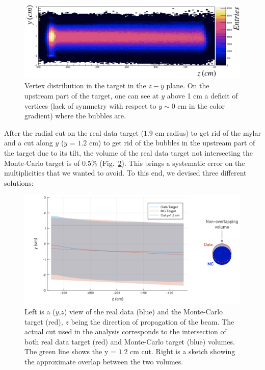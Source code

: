 \begin{figure}[!h]
  \centering
	\includegraphics[scale=0.45]{./gfx/targetview.png}
	\caption{Vertex distribution in the target in the $z-y$ plane. On the upstream part of the target, one can see at $y$ above 1 cm a deficit of vertices (lack of symmetry with respect to $y\sim0$ cm in the color gradient) where the bubbles are.}
	\label{pic:targetview}
\end{figure}


After the radial cut on the real data target ($1.9$ cm radius) to get rid of the mylar and a cut along $y$ ($y$ = $1.2$ cm) to get rid of the bubbles in the upstream part of the target due to its tilt, the volume of the real data target not intersecting the Monte-Carlo target is of $0.5$\% (Fig.~\ref{pic:Target}). This brings a systematic error on the multiplicities that we wanted to avoid. To this end, we devised three different solutions:

\begin{figure}[!h]
  \centering
	\includegraphics[scale=0.45]{./gfx/Targetcut.png}
	\caption{Left is a ($y$,$z$) view of the real data (blue) and the Monte-Carlo target (red), $z$ being the direction of propagation of the beam. The actual cut used in the analysis corresponds to the intersection of both real data target (red) and Monte-Carlo target (blue) volumes. The green line shows the y = $1.2$ cm cut. Right is a sketch showing the approximate overlap between the two volumes.}
	\label{pic:Target}
\end{figure}

